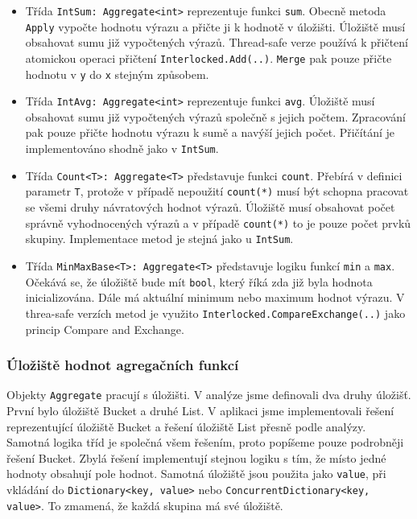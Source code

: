 \begin{itemize}
\item Třída \texttt{IntSum: Aggregate<int>} reprezentuje funkci \texttt{sum}.
Obecně metoda \texttt{Apply} vypočte hodnotu výrazu a přičte ji k hodnotě v úložišti.
Úložiště musí obsahovat sumu již vypočtených výrazů.
Thread-safe verze používá k přičtení atomickou operaci přičtení \texttt{Interlocked.Add(..)}.
\texttt{Merge} pak pouze přičte hodnotu v \texttt{y} do \texttt{x} stejným způsobem.
\item Třída \texttt{IntAvg: Aggregate<int>} reprezentuje funkci \texttt{avg}.
Úložiště musí obsahovat sumu již vypočtených výrazů společně s jejich počtem.
Zpracování pak pouze přičte hodnotu výrazu k sumě a navýší jejich počet.
Přičítání je implementováno shodně jako v \texttt{IntSum}.
\item Třída \texttt{Count<T>: Aggregate<T>} představuje funkci \texttt{count}.
Přebírá v definici parametr \texttt{T}, protože v případě nepoužití \texttt{count(*)} musí být schopna pracovat se všemi druhy návratových hodnot výrazů.
Úložiště musí obsahovat počet správně vyhodnocených výrazů a v případě \texttt{count(*)} to je pouze počet prvků skupiny.
Implementace metod je stejná jako u \texttt{IntSum}.
\item Třída \texttt{MinMaxBase<T>: Aggregate<T>} představuje logiku funkcí \texttt{min} a \texttt{max}.
Očekává se, že úložiště bude mít \texttt{bool}, který říká zda již byla hodnota inicializována.
Dále má aktuální minimum nebo maximum hodnot výrazu. 
V threa-safe verzích metod je využito \texttt{Interlocked.CompareExchange(..)} jako princip Compare and Exchange. 
\end{itemize}

\subsubsection{Úložiště hodnot agregačních funkcí}

Objekty \texttt{Aggregate} pracují s úložišti.
V analýze jsme definovali dva druhy úložišť.
První bylo úložiště Bucket a druhé List.
V aplikaci jsme implementovali řešení reprezentující úložiště Bucket a řešení úložiště List přesně podle analýzy.
Samotná logika tříd je společná všem řešením, proto popíšeme pouze podrobněji řešení Bucket.
Zbylá řešení implementují stejnou logiku s tím, že místo jedné hodnoty obsahují pole hodnot.
Samotná úložiště jsou použita jako \texttt{value}, při vkládání do \texttt{Dictionary<key, value>} nebo \texttt{ConcurrentDictionary<key, value>}.
To zmamená, že každá skupina má své úložiště.

